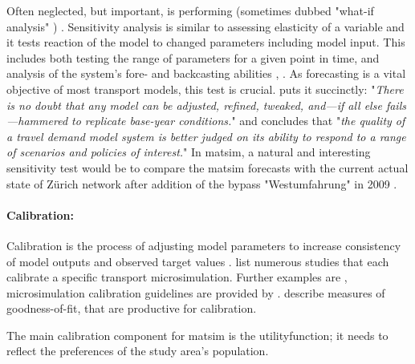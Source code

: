 Often neglected, but important, is performing  (sometimes dubbed "what-if analysis" \citep[][p.155]{Kleijnen_EJOR_1995}) \citep[][]{KurthEtAl_TRBTDF_2006, CambridgeSystematics_manual_2008, CFD_TRB_2007}. Sensitivity analysis is similar to assessing elasticity of a variable \citep[][p.3f]{WegmannEverett_TechRep_CTRUT_2008} and it tests reaction of the model to changed parameters including model input. This includes both testing the range of parameters for a given point in time, and analysis of the system's fore- and backcasting abilities \citep[e.g.,][p.56]{CFD_TRB_2007}, \citep[][]{CambridgeSystematics_manual_2008}. As forecasting is a vital objective of most transport models, this test is crucial. \citet[][p.158]{PendyalaBhat_TRBTDF_2006} puts it succinctly: "\emph{There is no doubt that any model can be adjusted, refined, tweaked, and---if all else fails---hammered to replicate base-year conditions.}" and concludes that "\emph{the quality of a travel demand model system is better judged on its ability to respond to a range of scenarios and policies of interest.}" In \gls{matsim}, a natural and interesting sensitivity test would be to compare the \gls{matsim} forecasts with the current actual state of Zürich network after addition of the bypass "Westumfahrung" in 2009 \citep[][]{BalmerEtAl_ResRep_bdktzrh_2009, Westumfahrung_Webpage_2008}.

\paragraph{Calibration:}
Calibration is the process of adjusting model parameters to increase consistency of model outputs and observed target values \citep[][p.348]{HollanderLiu_Transportation_2007} \citep[see also][]{TrucanoEtAl_RESS_2006}. \citet[][Table 1]{HollanderLiu_Transportation_2007} list numerous studies that each calibrate a specific transport microsimulation. Further examples are \citet[][]{SmithEtAl_JTE_2008, KimEtAl_TRR_2005, RutterEtAl_JASA_2009}, microsimulation calibration guidelines are provided by \citet[][]{MilamChao_TRBATPM_2001, WegmannEverett_TechRep_CTRUT_2008, DowlingEtAl_manual_2002}. \citet[][Table 2]{HollanderLiu_Transportation_2007} describe measures of goodness-of-fit, that are productive for calibration. 

The main calibration component for \gls{matsim} is the \gls{utilityfunction}; it needs to reflect the preferences of the study area's population.

